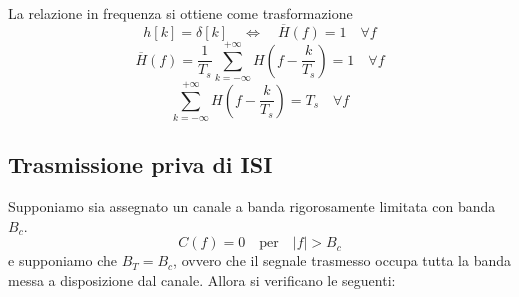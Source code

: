La relazione in frequenza si ottiene come trasformazione
\[ h[k] = \delta[k] \quad \Longleftrightarrow \quad \overline{H}(f) = 1 \quad \forall f \]
\[ \overline{H}(f) = \frac{1}{T_s} \sum_{k=-\infty}^{+\infty} H\left(f - \frac{k}{T_s}\right) = 1 \quad \forall f \]
\[ \sum_{k=-\infty}^{+\infty} H\left(f - \frac{k}{T_s}\right) = T_s \quad \forall f \]

\subsection*{Trasmissione priva di ISI}
Supponiamo sia assegnato un canale a banda rigorosamente limitata con banda \( B_c \).
\[ C(f) = 0 \quad \text{per} \quad |f| > B_c \]
e supponiamo che \( B_T = B_c \), ovvero che il segnale trasmesso occupa tutta la banda messa a disposizione dal canale.
Allora si verificano le seguenti:
